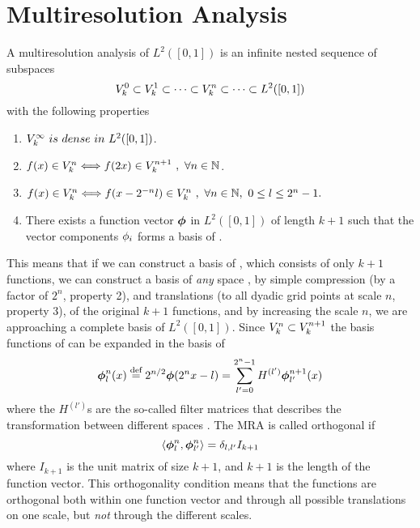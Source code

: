 \section{Multiresolution Analysis}
A multiresolution analysis of $L^2([0,1])$ is an infinite nested sequence of subspaces
\begin{equation}
    \label{eq:MRA}
    {V}_{k}^{0}\subset {V}_{k}^{1}\subset \cdots \subset 
	{V}_{k}^{n}\subset \cdots \subset L^2([0,1])
\end{equation}
with the following properties
\begin{enumerate}
    \item $\scalingspace{\infty}\ is\ dense\ in\ L^2([0,1])$.
    \item $f(x) \in {V}_{k}^{n} \Longleftrightarrow f(2x) \in {V}_{k}^{n+1}
    	\ ,\ \forall n \in \mathbb{N}$.
    \item $f(x) \in {V}_{k}^{n} \Longleftrightarrow f(x-2^{-n}l) \in 
	{V}_{k}^{n}\ ,\ \forall n \in \mathbb{N},\ 0 \leq l \leq 2^n - 1.$
    \item There exists a function vector $\boldsymbol{\phi}$ in $L^2([0,1])$ of length
	$k+1$ such that the vector components $\phi_i$ forms a basis of 
	. 
\end{enumerate}
This means that if we can construct a basis of , which consists of 
only $k+1$ functions, we can construct a basis of \emph{any} space , 
by simple compression (by a factor of $2^n$, property 2), and translations (to all 
dyadic grid points at scale $n$, property 3), of the original $k+1$ functions, and 
by increasing the scale $n$, we are approaching a complete basis of $L^2([0,1])$. 
Since ${V}_{k}^{n} \subset {V}_{k}^{n+1}$ the basis functions of 
 can be expanded in the basis of 
\begin{equation}
    \label{eq:twoscalescaling}
    \boldsymbol{\phi}^n_l(x) \stackrel{\text{def}}{\hbox{=}} 2^{n/2}\boldsymbol{\phi}(2^nx-l) = 
	\sum_{l'=0}^{2^n-1} H^{(l')} \boldsymbol{\phi}^{n+1}_{l'}(x)
\end{equation}
where the $H^{(l')}$s are the so-called filter matrices that describes the 
transformation between different spaces . The MRA is called 
orthogonal if 
\begin{equation}
    \label{eq:orthogonality}
    \langle \boldsymbol{\phi}_l^n, \boldsymbol{\phi}_{l'}^n \rangle = \delta_{l,l'}I_{k+1}
\end{equation}
where $I_{k+1}$ is the unit matrix of size $k+1$, and $k+1$ is the 
length of the function vector. This orthogonality condition means that the 
functions are orthogonal both within one function vector and through all 
possible translations on one scale, but \emph{not} through the different scales.

